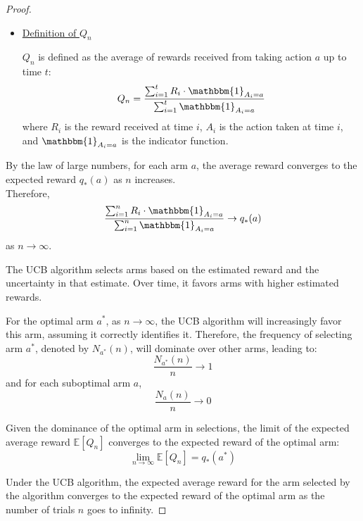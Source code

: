 \documentclass{article}
\begin{document}
\begin{enumerate}[a)]
\begin{proof}
\begin{itemize}
            \item \underline{Definition of $Q_n$}\par 
            $Q_n$ is defined as the average of rewards received from taking action $a$ up to time $t$:
            \[ Q_n = \frac{\sum_{i=1}^{t} R_i \cdot \mathbbm{1}_{A_i=a}}{\sum_{i=1}^{t} \mathbbm{1}_{A_i=a}} \]
            where $R_i$ is the reward received at time $i$, $A_i$ is the action taken at time $i$, and $\mathbbm{1}_{A_i=a}$ is the indicator function.
        \end{itemize}

        By the law of large numbers, for each arm $a$, the average reward converges to the expected reward $q_{*}(a)$ as $n$ increases.\\

        Therefore,
        \[ \frac{\sum_{i=1}^{n} R_i \cdot \mathbbm{1}_{A_i=a}}{\sum_{i=1}^{n} \mathbbm{1}_{A_i=a}} \to q_{*}(a) \]
        as $n \to \infty$.
        
        The UCB algorithm selects arms based on the estimated reward and the uncertainty in that estimate. Over time, it favors arms with higher estimated rewards.
        

        For the optimal arm $a^*$, as $n \to \infty$, the UCB algorithm will increasingly favor this arm, assuming it correctly identifies it. Therefore, the frequency of selecting arm $a^*$, denoted by $N_{a^*}(n)$, will dominate over other arms, leading to:
        \[ \frac{N_{a^*}(n)}{n} \to 1 \]
        and for each suboptimal arm $a$,
        \[ \frac{N_a(n)}{n} \to 0 \]
        

        Given the dominance of the optimal arm in selections, the limit of the expected average reward $\mathbb{E}[Q_n]$ converges to the expected reward of the optimal arm:
        \[ \lim_{n \to \infty} \mathbb{E}[Q_n] = q_{*}(a^*) \]
        

        Under the UCB algorithm, the expected average reward for the arm selected by the algorithm converges to the expected reward of the optimal arm as the number of trials $n$ goes to infinity.\par 
    \end{proof}
    
\end{enumerate}
\end{document}
